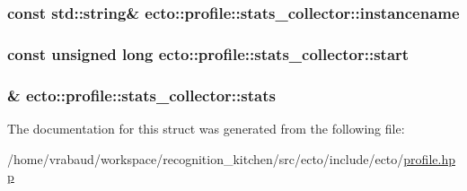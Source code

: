 \subsubsection[{\texorpdfstring{instancename}{instancename}}]{\setlength{\rightskip}{0pt plus 5cm}const std\+::string\& ecto\+::profile\+::stats\+\_\+collector\+::instancename}\hypertarget{structecto_1_1profile_1_1stats__collector_ac3d5d7adf91b02719a6b897869683f03}{}\label{structecto_1_1profile_1_1stats__collector_ac3d5d7adf91b02719a6b897869683f03}
\subsubsection[{\texorpdfstring{start}{start}}]{\setlength{\rightskip}{0pt plus 5cm}const unsigned long ecto\+::profile\+::stats\+\_\+collector\+::start}\hypertarget{structecto_1_1profile_1_1stats__collector_ae607313a8ecc75d6a6ab201cdf7c2d61}{}\label{structecto_1_1profile_1_1stats__collector_ae607313a8ecc75d6a6ab201cdf7c2d61}
\subsubsection[{\texorpdfstring{stats}{stats}}]{\& ecto\+::profile\+::stats\+\_\+collector\+::stats}\hypertarget{structecto_1_1profile_1_1stats__collector_a2c206fb60ea04b5162ec43a609f2a185}{}\label{structecto_1_1profile_1_1stats__collector_a2c206fb60ea04b5162ec43a609f2a185}


The documentation for this struct was generated from the following file\+:\begin{DoxyCompactItemize}
\item 
/home/vrabaud/workspace/recognition\+\_\+kitchen/src/ecto/include/ecto/\hyperlink{profile_8hpp}{profile.\+hpp}\end{DoxyCompactItemize}
